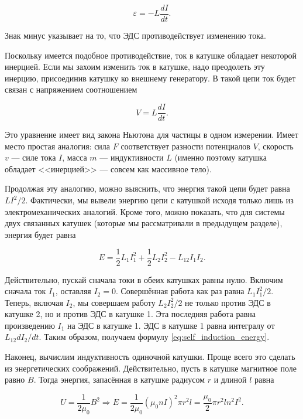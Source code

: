 \documentclass[11pt,a4paper]{article}
\numberwithin{equation}{section}
\newcommand{\vareps}{\varepsilon}
\begin{document}
\begin{equation}
  \label{eq:self_induction_3}
  \vareps = - L \frac{dI}{dt}. 
\end{equation}

Знак минус указывает на то, что ЭДС противодействует изменению тока. 

Поскольку имеется подобное противодействие, ток в катушке обладает
некоторой инерцией. Если мы захоим изменить ток в катушке, надо
преодолеть эту инерцию, присоединив катушку ко внешнему генератору. В
такой цепи ток будет связан с напряжением соотношением

\begin{equation}
  \label{eq:self_induction_4}
  V = L \frac{dI}{dt}.
\end{equation}

Это уравнение имеет вид закона Ньютона для частицы в одном
измерении. Имеет место простая аналогия: сила $F$ соответствует
разности потенциалов $V$, скорость $v$ --- силе тока $I$, масса $m$
--- индуктивности $L$ (именно поэтому катушка обладает <<инерцией>>
--- совсем как массивное тело). 

Продолжая эту аналогию, можно выяснить, что энергия такой цепи будет
равна $LI^2/2$. Фактически, мы вывели энергию цепи с катушкой исходя
только лишь из электромеханических аналогий. Кроме того, можно
показать, что для системы двух связанных катушек (которые мы
рассматривали в предыдущем разделе), энергия будет равна

\begin{equation}
  \label{eq:self_induction_energy}
  E = \frac12 L_1 I_1^2 + \frac12 L_2 I_2^2 - L_{12} I_1 I_2.
\end{equation}

Действительно, пускай сначала токи в обеих катушках равны
нулю. Включим сначала ток $I_1$, оставляя $I_2=0$. Совершённая работа
как раз равна $L_1 I_1^2/2$. Теперь, включая $I_2$, мы совершаем
работу $L_2 I_2^2/2$ не только против ЭДС в катушке 2, но и против ЭДС
в катушке 1. Эта последняя работа равна произведению $I_1$ на ЭДС в
катушке 1. ЭДС в катушке 1 равна интегралу от $L_{12} dI_2/dt$. Таким
образом, получаем формулу \eqref{eq:self_induction_energy}. 


Наконец, вычислим индуктивность одиночной катушки. Проще всего это
сделать из энергетических соображений. Действительно, пусть в катушке
магнитное поле равно $B$. Тогда энергия, запасённая в катушке радиусом
$r$ и длиной $l$ равна

\begin{equation}
  \label{eq:coil_energy_1}
  U = \frac{1}{2 \mu_0} B^2 \Rightarrow E = \frac{1}{2\mu_0} (\mu_0 n
  I)^2 \pi r^2 l = \frac{\mu_0}{2} \pi r^2 l n^2 I^2.
\end{equation}
\end{document}
